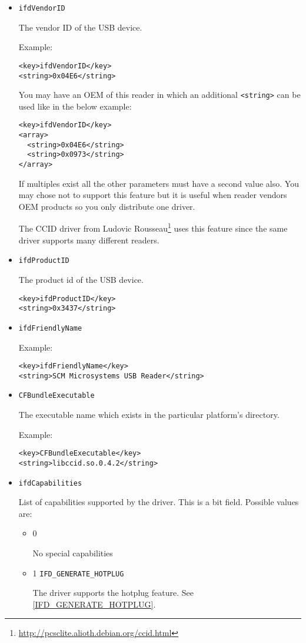 \documentclass[a4paper,12pt]{article}
\begin{document}
\begin{itemize}
\item \texttt{ifdVendorID}

The vendor ID of the USB device.

Example:
\begin{verbatim}
<key>ifdVendorID</key>
<string>0x04E6</string>
\end{verbatim}

You may have an OEM of this reader in which an additional
\texttt{<string>} can be used like in the below example:
\begin{verbatim}
<key>ifdVendorID</key>
<array>
  <string>0x04E6</string>
  <string>0x0973</string>
</array>
\end{verbatim}

If multiples exist all the other parameters must have a second value
also. You may chose not to support this feature but it is useful when
reader vendors OEM products so you only distribute one driver.

The CCID driver from Ludovic
Rousseau\footnote{\url{http://pcsclite.alioth.debian.org/ccid.html}}
uses this feature since the same driver supports many different readers.

\item \texttt{ifdProductID}

The product id of the USB device.

\begin{verbatim}
<key>ifdProductID</key>
<string>0x3437</string>
\end{verbatim}

\item \texttt{ifdFriendlyName}

Example:
\begin{verbatim}
<key>ifdFriendlyName</key>
<string>SCM Microsystems USB Reader</string>
\end{verbatim}

\item \texttt{CFBundleExecutable}

The executable name which exists in the particular platform's directory.

Example:
\begin{verbatim}
<key>CFBundleExecutable</key>
<string>libccid.so.0.4.2</string>
\end{verbatim}

\item \texttt{ifdCapabilities}

List of capabilities supported by the driver. This is a bit field.
Possible values are:

\begin{itemize}
\item 0

No special capabilities

\item 1 \texttt{IFD\_GENERATE\_HOTPLUG}

The driver supports the hotplug feature. See
\ref{IFD_GENERATE_HOTPLUG}.

\end{itemize}


\end{itemize}
\end{document}
